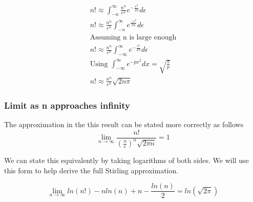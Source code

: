 \documentclass[a4paper]{article}
\begin{document}
\begin{theorem}
\begin{gather*}
            \\
            n!
            \approx
            \int_{-n}^{\infty} \frac{n^n}{e^n} e^{-\frac{\epsilon^2}{2n}} d\epsilon
            \\
            n!
            \approx
            \frac{n^n}{e^n}
            \int_{-n}^{\infty}  e^{\frac{-\epsilon^2}{2n}} d\epsilon
            \\
            \text{Assuming n is large enough}
            \\
            n!
            \approx
            \frac{n^n}{e^n}
            \int_{-\infty}^{\infty}  e^{-\frac{\epsilon^2}{2n}} d\epsilon
            \\
            \text{Using $\int_{-\infty}^{\infty}  e^{-px^2} dx = \sqrt{\frac{\pi}{p}}$}
            \\
            n!
            \approx
            \frac{n^n}{e^n} \sqrt{2n \pi}
        \end{gather*}
    \end{theorem}

    \subsubsection{Limit as n approaches infinity}

    The approximation in the this result can be stated more correctly as follows
    \begin{equation}
        \label{eq:stirling_limit}
        \boxed{\lim_{n \to \infty} \frac{n!}{(\frac{n}{e})^n \sqrt{2\pi n}} = 1
        }
    \end{equation}

    We can state this equivalently by taking logarithms of both sides.
    We will use this form to help derive the full Stirling approximation.

    \begin{equation}
        \label{eq:stirling-limit-log}
        \boxed{\lim_{n \to \infty}
            ln(n!) - nln(n) + n - \frac{ln(n)}{2}= ln(\sqrt{2\pi})
        }
    \end{equation}
\end{document}
